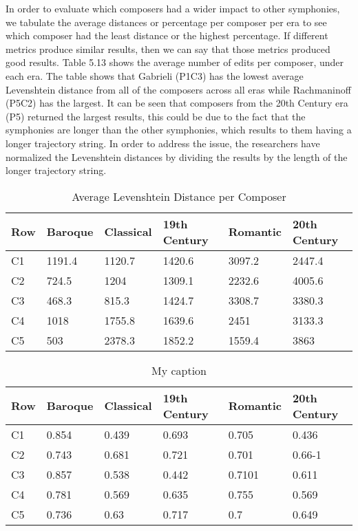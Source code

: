 In order to evaluate which composers had a wider impact to other symphonies, we tabulate the average distances or percentage per composer per era to see which composer had the least distance or the highest percentage. If different metrics produce similar results, then we can say that those metrics produced good results. Table 5.13 shows the average number of edits per composer, under each era. The table shows that Gabrieli (P1C3) has the lowest average Levenshtein distance from all of the composers across all eras while Rachmaninoff (P5C2) has the largest. It can be seen that composers from the 20th Century era (P5) returned the largest results, this could be due to the fact that the symphonies are longer than the other symphonies, which results to them having a longer trajectory string. In order to address the issue, the researchers have normalized the Levenshtein distances by dividing the results by the length of the longer trajectory string.

\begin{longtable}{|l|l|l|l|l|l|}
\caption{Average Levenshtein Distance per Composer}
\label{my-label}\\
\hline
Row & Baroque & Classical & 19th Century & Romantic & 20th Century \\ \hline
\endfirsthead
%
\endhead
%
C1 & 1191.4 & 1120.7 & 1420.6 & 3097.2 & 2447.4 \\ \hline
C2 & 724.5 & 1204 & 1309.1 & 2232.6 & 4005.6 \\ \hline
C3 & 468.3 & 815.3 & 1424.7 & 3308.7 & 3380.3 \\ \hline
C4 & 1018 & 1755.8 & 1639.6 & 2451 & 3133.3 \\ \hline
C5 & 503 & 2378.3 & 1852.2 & 1559.4 & 3863 \\ \hline
\end{longtable}

\begin{longtable}{|l|l|l|l|l|l|}
\caption{My caption}
\label{my-label}\\
\hline
Row & Baroque & Classical & 19th Century & Romantic & 20th Century \\ \hline
\endfirsthead
%
\endhead
%
C1 & 0.854 & 0.439 & 0.693 & 0.705 & 0.436 \\ \hline
C2 & 0.743 & 0.681 & 0.721 & 0.701 & 0.66-1 \\ \hline
C3 & 0.857 & 0.538 & 0.442 & 0.7101 & 0.611 \\ \hline
C4 & 0.781 & 0.569 & 0.635 & 0.755 & 0.569 \\ \hline
C5 & 0.736 & 0.63 & 0.717 & 0.7 & 0.649 \\ \hline
\end{longtable}

